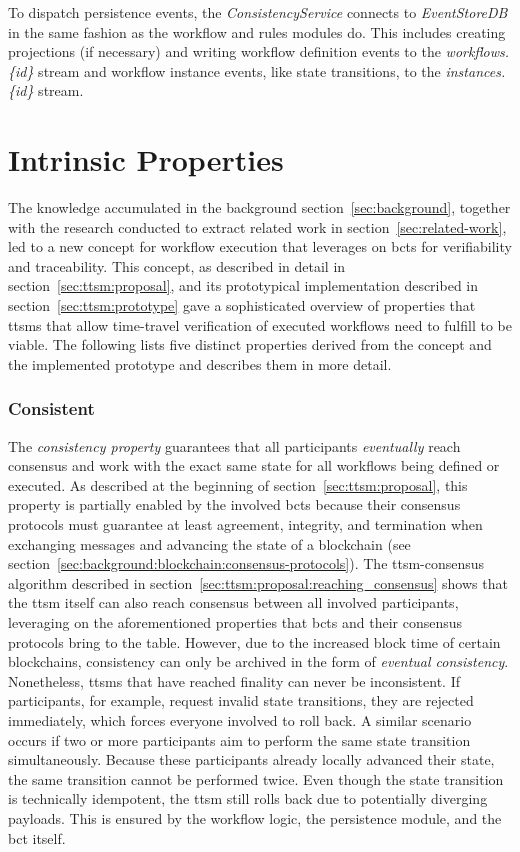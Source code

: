 To dispatch persistence events, the \textit{ConsistencyService} connects to \textit{EventStoreDB} in the same fashion as the workflow and rules modules do. This includes creating projections (if necessary) and writing workflow definition events to the \textit{workflows.\{id\}} stream and workflow instance events, like state transitions, to the \textit{instances.\{id\}} stream.



\section{Intrinsic Properties}
\label{sec:ttsm:properties}
The knowledge accumulated in the background section~\ref{sec:background}, together with the research conducted to extract related work in section~\ref{sec:related-work}, led to a new concept for workflow execution that leverages on \glspl{bct} for verifiability and traceability. This concept, as described in detail in section~\ref{sec:ttsm:proposal}, and its prototypical implementation described in section~\ref{sec:ttsm:prototype} gave a sophisticated overview of properties that \glspl{ttsm} that allow time-travel verification of executed workflows need to fulfill to be viable. The following lists five distinct properties derived from the concept and the implemented prototype and describes them in more detail.

\subsubsection{Consistent}
\label{sec:ttsm:properties:consistent}
The \textit{consistency property} guarantees that all participants \textit{eventually} reach consensus and work with the exact same state for all workflows being defined or executed. As described at the beginning of section~\ref{sec:ttsm:proposal}, this property is partially enabled by the involved \glspl{bct} because their consensus protocols must guarantee at least agreement, integrity, and termination when exchanging messages and advancing the state of a blockchain (see section~\ref{sec:background:blockchain:consensus-protocols}). The \gls{ttsm}-consensus algorithm described in section~\ref{sec:ttsm:proposal:reaching_consensus} shows that the \gls{ttsm} itself can also reach consensus between all involved participants, leveraging on the aforementioned properties that \glspl{bct} and their consensus protocols bring to the table. However, due to the increased block time of certain blockchains, consistency can only be archived in the form of \textit{eventual consistency}. Nonetheless, \glspl{ttsm} that have reached finality can never be inconsistent. If participants, for example, request invalid state transitions, they are rejected immediately, which forces everyone involved to roll back. A similar scenario occurs if two or more participants aim to perform the same state transition simultaneously. Because these participants already locally advanced their state, the same transition cannot be performed twice. Even though the state transition is technically idempotent, the \gls{ttsm} still rolls back due to potentially diverging payloads. This is ensured by the workflow logic, the persistence module, and the \gls{bct} itself.

